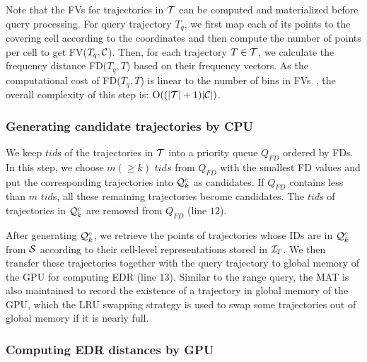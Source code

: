 \documentclass[10pt,conference,letterpaper]{IEEEtran}
\newcommand{\rangeq}{{{\cal Q}_r}\xspace}
\newcommand{\simcand}{{{\cal Q}_k^c}\xspace}
\newcommand{\alltraj}{{{\cal T}}\xspace}
\newcommand{\allcell}{{\cal C}\xspace}
\newcommand{\trajtable}{{\cal S}\xspace}
\newcommand{\trajindex}{{{\cal I}_T}\xspace}
\newcommand{\bigoh}{{\rm O}\xspace}
\begin{document}
Note that the FVs for trajectories in $\alltraj$ can be computed and materialized before query processing. For query trajectory $T_q$, we first map each of its points to the covering cell according to the coordinates and then compute the number of points per cell to get FV($T_q, \allcell$). Then, for each trajectory $T\in\alltraj$, we calculate the frequency distance FD($T_q, T$) based on their frequency vectors.
%
As the computational cost of FD($T_q, T$) is linear to the number of bins in FVs~\cite{DBLP:conf/sigmod/ChenOO05}, the overall complexity of this step is: $\bigoh((|\alltraj|+1)|\allcell|)$.







\subsubsection{Generating candidate trajectories by CPU}
We keep $tid$s of the trajectories in $\alltraj$ into a priority queue ${Q}_{FD}$ ordered by FDs. In this step, we choose $m(\geq k)$  $tids$ from ${Q}_{FD}$ with the smallest FD values and put the corresponding trajectories into $\simcand$ as candidates. If ${Q}_{FD}$ contains less than $m$ $tid$s, all these remaining trajectories become candidates. The $tid$s of trajectories in $\simcand$ are removed from ${Q}_{FD}$ (line $12$).

After generating $\simcand$, we retrieve the points of trajectories whose IDs are in $\simcand$ from $\trajtable$ according to their cell-level representations stored in $\trajindex$. We then transfer these trajectories together with the query trajectory to global memory of the GPU for computing EDR (line $13$).
Similar to the range query, the MAT is also maintained to record the existence of a trajectory in global memory of the GPU, which the LRU swapping strategy is used to swap some trajectories out of global memory if it is nearly full.




\subsubsection{Computing EDR distances by GPU}
\end{document}
